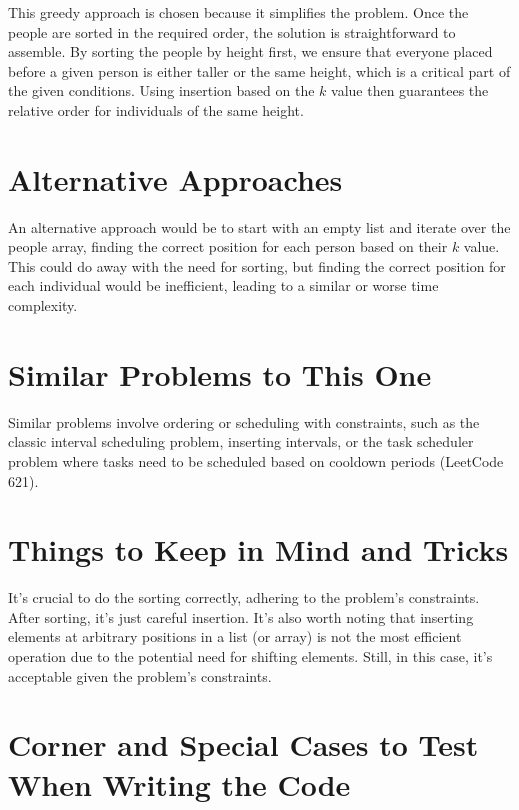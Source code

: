 This greedy approach is chosen because it simplifies the problem. Once the people are sorted in the required order, the solution is straightforward to assemble. By sorting the people by height first, we ensure that everyone placed before a given person is either taller or the same height, which is a critical part of the given conditions. Using insertion based on the \( k \) value then guarantees the relative order for individuals of the same height.

\section*{Alternative Approaches}

An alternative approach would be to start with an empty list and iterate over the people array, finding the correct position for each person based on their \( k \) value. This could do away with the need for sorting, but finding the correct position for each individual would be inefficient, leading to a similar or worse time complexity.

\section*{Similar Problems to This One}

Similar problems involve ordering or scheduling with constraints, such as the classic interval scheduling problem, inserting intervals, or the task scheduler problem where tasks need to be scheduled based on cooldown periods (LeetCode 621).

\section*{Things to Keep in Mind and Tricks}

It's crucial to do the sorting correctly, adhering to the problem's constraints. After sorting, it's just careful insertion. It's also worth noting that inserting elements at arbitrary positions in a list (or array) is not the most efficient operation due to the potential need for shifting elements. Still, in this case, it's acceptable given the problem's constraints.

\section*{Corner and Special Cases to Test When Writing the Code}

